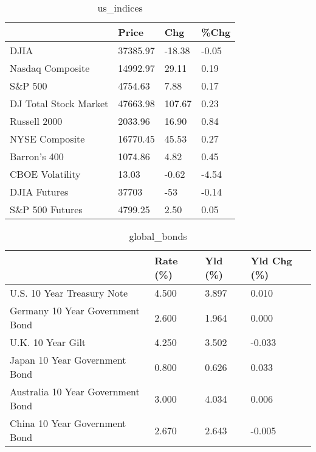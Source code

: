 \documentclass{article}%
\begin{document}
%


\begin{table}[htbp]%
\caption{us\_indices}%
\centering%
\begin{adjustbox}{width=1\textwidth}%
\begin{tabular}{llll}
\toprule
                      &    Price &    Chg &  \%Chg \\
\midrule
                 DJIA & 37385.97 & -18.38 & -0.05 \\
     Nasdaq Composite & 14992.97 &  29.11 &  0.19 \\
              S\&P 500 &  4754.63 &   7.88 &  0.17 \\
DJ Total Stock Market & 47663.98 & 107.67 &  0.23 \\
         Russell 2000 &  2033.96 &  16.90 &  0.84 \\
       NYSE Composite & 16770.45 &  45.53 &  0.27 \\
         Barron's 400 &  1074.86 &   4.82 &  0.45 \\
      CBOE Volatility &    13.03 &  -0.62 & -4.54 \\
         DJIA Futures &    37703 &    -53 & -0.14 \\
      S\&P 500 Futures &  4799.25 &   2.50 &  0.05 \\
\bottomrule
\end{tabular}
%
\end{adjustbox}%
\end{table}

%


\begin{table}[htbp]%
\caption{global\_bonds}%
\centering%
\begin{adjustbox}{width=1\textwidth}%
\begin{tabular}{llll}
\toprule
                                  & Rate (\%) & Yld (\%) & Yld Chg (\%) \\
\midrule
       U.S. 10 Year Treasury Note &    4.500 &   3.897 &       0.010 \\
  Germany 10 Year Government Bond &    2.600 &   1.964 &       0.000 \\
                U.K. 10 Year Gilt &    4.250 &   3.502 &      -0.033 \\
    Japan 10 Year Government Bond &    0.800 &   0.626 &       0.033 \\
Australia 10 Year Government Bond &    3.000 &   4.034 &       0.006 \\
    China 10 Year Government Bond &    2.670 &   2.643 &      -0.005 \\
\bottomrule
\end{tabular}
%
\end{adjustbox}%
\end{table}
\end{document}
